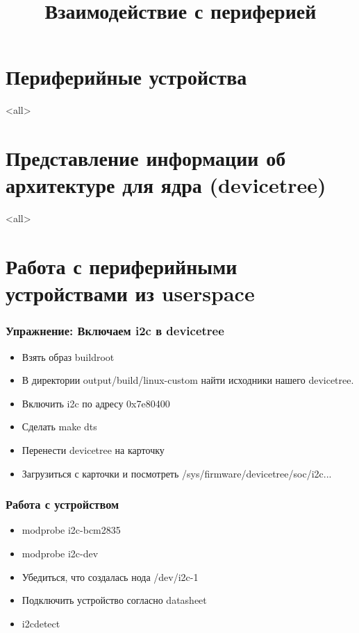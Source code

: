 

\title{Взаимодействие с периферией}



\begin{frame}
  \frametitle{}
\end{frame}

\section{Периферийные устройства}
\mode<all>{}
\section{Представление информации об архитектуре для ядра (devicetree)}
\mode<all>{}


\section{Работа с периферийными устройствами из userspace}

\begin{frame}
  \frametitle{Упражнение: Включаем i2c в devicetree}
  \begin{itemize}
      \item Взять образ buildroot 
      \item В директории output/build/linux-custom найти исходники нашего devicetree.
      \item Включить i2c по адресу 0x7e80400
      \item Сделать make dts
      \item Перенести devicetree на карточку
      \item Загрузиться с карточки и посмотреть /sys/firmware/devicetree/soc/i2c...
  \end{itemize}
\end{frame}

\begin{frame}
  \frametitle{Работа с устройством}
  \begin{itemize}
      \item modprobe i2c-bcm2835
      \item modprobe i2c-dev
      \item Убедиться, что создалась нода /dev/i2c-1
      \item Подключить устройство согласно datasheet
      \item i2cdetect
  \end{itemize}
\end{frame}


